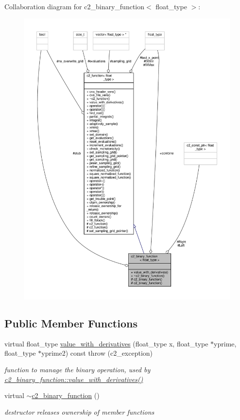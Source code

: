 Collaboration diagram for c2\+\_\+binary\+\_\+function$<$ float\+\_\+type $>$\+:
\nopagebreak
\begin{figure}[H]
\begin{center}
\leavevmode
\includegraphics[width=350pt]{classc2__binary__function__coll__graph}
\end{center}
\end{figure}
\subsection*{Public Member Functions}
\begin{DoxyCompactItemize}
\item 
virtual float\+\_\+type \hyperlink{classc2__binary__function_a7ab60d022222ce65e99f8708bf2aae0d}{value\+\_\+with\+\_\+derivatives} (float\+\_\+type x, float\+\_\+type $\ast$yprime, float\+\_\+type $\ast$yprime2) const   throw (c2\+\_\+exception)
\begin{DoxyCompactList}\small\item\em function to manage the binary operation, used by \hyperlink{classc2__binary__function_a7ab60d022222ce65e99f8708bf2aae0d}{c2\+\_\+binary\+\_\+function\+::value\+\_\+with\+\_\+derivatives()} \end{DoxyCompactList}\item 
virtual \hyperlink{classc2__binary__function_aaec2d1f2a53845f36974b0b82786d4f2}{$\sim$c2\+\_\+binary\+\_\+function} ()
\begin{DoxyCompactList}\small\item\em destructor releases ownership of member functions \end{DoxyCompactList}\end{DoxyCompactItemize}
